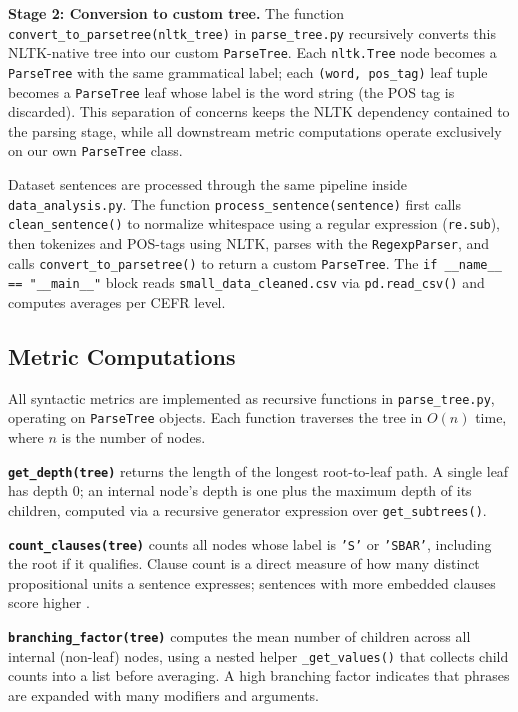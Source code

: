 \documentclass[11pt]{article}
\begin{document}
\textbf{Stage 2: Conversion to custom tree.} The function \texttt{convert\_to\_parsetree(nltk\_tree)} in \texttt{parse\_tree.py} recursively converts this NLTK-native tree into our custom \texttt{ParseTree}. Each \texttt{nltk.Tree} node becomes a \texttt{ParseTree} with the same grammatical label; each \texttt{(word, pos\_tag)} leaf tuple becomes a \texttt{ParseTree} leaf whose label is the word string (the POS tag is discarded). This separation of concerns keeps the NLTK dependency contained to the parsing stage, while all downstream metric computations operate exclusively on our own \texttt{ParseTree} class.
 
Dataset sentences are processed through the same pipeline inside \texttt{data\_analysis.py}. The function \texttt{process\_sentence(sentence)} first calls \texttt{clean\_sentence()} to normalize whitespace using a regular expression (\texttt{re.sub}), then tokenizes and POS-tags using NLTK, parses with the \texttt{RegexpParser}, and calls \texttt{convert\_to\_parsetree()} to return a custom \texttt{ParseTree}. The \texttt{if \_\_name\_\_ == "\_\_main\_\_"} block reads \texttt{small\_data\_cleaned.csv} via \texttt{pd.read\_csv()} and computes averages per CEFR level.
 
\subsection*{Metric Computations}
 
All syntactic metrics are implemented as recursive functions in \texttt{parse\_tree.py}, operating on \texttt{ParseTree} objects. Each function traverses the tree in $O(n)$ time, where $n$ is the number of nodes.
 
\textbf{\texttt{get\_depth(tree)}} returns the length of the longest root-to-leaf path. A single leaf has depth 0; an internal node's depth is one plus the maximum depth of its children, computed via a recursive generator expression over \texttt{get\_subtrees()}.
 
\textbf{\texttt{count\_clauses(tree)}} counts all nodes whose label is \texttt{'S'} or \texttt{'SBAR'}, including the root if it qualifies. Clause count is a direct measure of how many distinct propositional units a sentence expresses; sentences with more embedded clauses score higher \cite{zhang2025}.
 
\textbf{\texttt{branching\_factor(tree)}} computes the mean number of children across all internal (non-leaf) nodes, using a nested helper \texttt{\_get\_values()} that collects child counts into a list before averaging. A high branching factor indicates that phrases are expanded with many modifiers and arguments.
 
\end{document}
